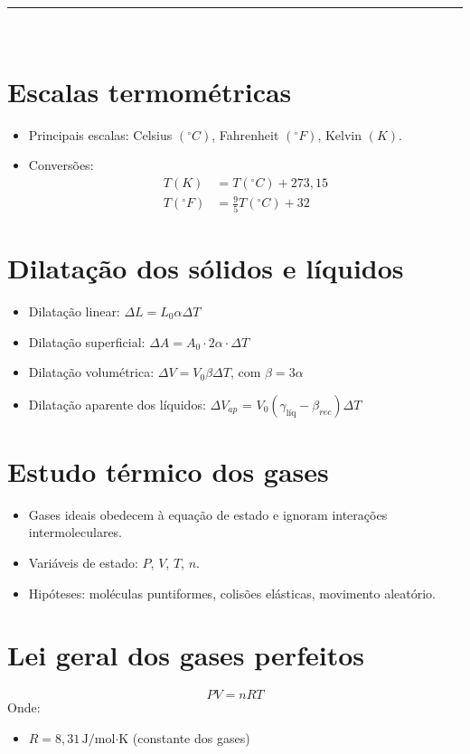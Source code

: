 \documentclass[a4paper,12pt]{article}
\begin{document}
\begin{multicols}{2}
\noindent\rule{\linewidth}{1pt}\\

\section{Escalas termométricas}

\begin{itemize}
    \item Principais escalas: Celsius $(^\circ C)$, Fahrenheit $(^\circ F)$, Kelvin $(K)$.
    \item Conversões:
    \begin{align*}
        T(K) &= T(^\circ C) + 273{,}15 \\
        T(^\circ F) &= \frac{9}{5}T(^\circ C) + 32
    \end{align*}
\end{itemize}

\section{Dilatação dos sólidos e líquidos}
\begin{itemize}
    \item Dilatação linear: $\Delta L = L_0 \alpha \Delta T$
    \item Dilatação superficial: $\Delta A = A_0 \cdot 2\alpha \cdot \Delta T$
    \item Dilatação volumétrica: $\Delta V = V_0 \beta \Delta T$, com $\beta = 3\alpha$
    \item Dilatação aparente dos líquidos: $\Delta V_{ap}$  = $V_0 (\gamma_{\text{líq}} -\beta_{rec}) \Delta T$
\end{itemize}

\section{Estudo térmico dos gases}
\begin{itemize}
    \item Gases ideais obedecem à equação de estado e ignoram interações intermoleculares.
    \item Variáveis de estado: $P$, $V$, $T$, $n$.
    \item Hipóteses: moléculas puntiformes, colisões elásticas, movimento aleatório.
\end{itemize}

\section{Lei geral dos gases perfeitos}
\begin{equation}
    PV = nRT
\end{equation}
Onde:
\begin{itemize}
    \item $R = 8{,}31 \, \text{J/mol·K}$ (constante dos gases)
\end{itemize}


\end{multicols}
\end{document}
